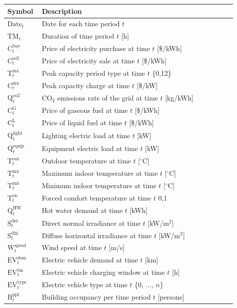 \documentclass[11pt]{article}
\begin{document}
\begin{center}
\centering
\begin{tabular}{p{0.12\linewidth}p{0.8\linewidth}}
\hline
\textbf{Symbol} & \textbf{Description} \\
\hline
\(\text{Date}_t\) & Date for each time period \(t\) \\
\(\text{TM}_t\) & Duration of time period \(t\) [h] \\
\(\text{C}^\text{buy}_t\) & Price of electricity purchase at time \(t\) [\$/kWh] \\
\(\text{C}^\text{sell}_t\) & Price of electricity sale at time \(t\) [\$/kWh] \\
\(\text{T}^\text{mx}_t\) & Peak capacity period type at time \(t\) \{0,12\} \\
\(\text{C}^\text{mx}_t\) & Peak capacity charge at time \(t\) [\$/kW] \\
\(\text{Q}^\text{co2}_t\) & CO\(_2\) emissions rate of the grid at time \(t\) [kg/kWh] \\
\(\text{C}^\text{G}_t\) & Price of gaseous fuel at time \(t\) [\$/kWh] \\
\(\text{C}^\text{L}_t\) & Price of liquid fuel at time \(t\) [\$/kWh] \\
\(\text{Q}^\text{light}_t\) & Lighting electric load at time \(t\) [kW] \\
\(\text{Q}^\text{equip}_t\) & Equipment electric load at time \(t\) [kW] \\
\(\text{T}^\text{out}_t\) & Outdoor temperature at time \(t\) [\(^\circ\text{C}\)] \\
\(\text{T}^\text{mx}_t\) & Maximum indoor temperature at time \(t\) [\(^\circ\text{C}\)] \\
\(\text{T}^\text{mn}_t\) & Minimum indoor temperature at time \(t\) [\(^\circ\text{C}\)] \\
\(\text{T}^\text{on}_t\) & Forced comfort temperature at time \(t\) {0,1} \\
\(\text{Q}^\text{HW}_t\) & Hot water demand at time \(t\) [kWh] \\
\(\text{S}^\text{dni}_t\) & Direct normal irradiance at time \(t\) [kW/m\(^2\)] \\
\(\text{S}^\text{dhi}_t\) & Diffuse horizontal irradiance at time \(t\) [kW/m\(^2\)] \\
\(\text{W}^\text{speed}_t\) & Wind speed at time \(t\) [m/s] \\
\(\text{EV}^\text{dem}_t\) & Electric vehicle demand at time \(t\) [km] \\
\(\text{EV}^\text{tm}_t\) & Electric vehicle charging window at time \(t\) [h] \\
\(\text{EV}^\text{type}_t\) & Electric vehicle type at time \(t\) \{0, ..., \(n\)\} \\
\(\text{B}^\text{ppl}_t\) & Building occupancy per time period \(t\) [persons] \\
\hline
\end{tabular}
\captionsetup{type=table}
\label{tab:time_period_parameters}
\end{center}
\end{document}
